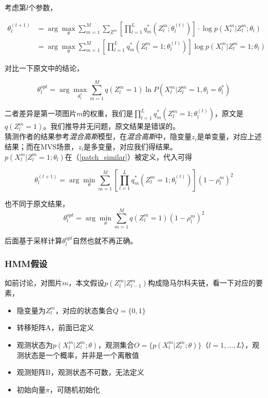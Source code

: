 		考虑第$l$个参数，

		\begin{align}
			\theta^{(t+1)}_l 
			&=\arg\max_\theta \sum_{m=1}^M \sum_{Z^m} 
			\left[ 
				\prod_{l=1}^L q^*_m(Z^m_l;\theta^{(t)}_l) \right]\cdot
				\log p(X^m_l|Z^m_l;\theta_l)
			\\
			&=\arg\max_\theta \sum_{m=1}^M 
				\left[
					\prod_{l=1}^L q^*_m(Z^m_l=1;\theta^{(t)}_l)
				\right]\log p(X^m_l|Z^m_l=1;\theta_l)\label{em_theta}
		\end{align}

		对比一下原文中的结论，

		\begin{equation}
			\theta^{opt}_l = \arg\max_{\theta^*_l}\sum_{m=1}^Mq(Z^m_l = 1)\ln P(X^m_l|Z^m_l=1,\theta_l=\theta^*_l)
		\end{equation}
		
		二者差异是第一项图片$m$的权重，我们是$\prod_{l=1}^L q^*_m(Z^m_l=1;\theta^{(t)}_l)$，原文是$q(Z^m_l = 1)$。我们推导并无问题，原文结果是错误的。\\

		猜测作者的结果参考\textit{混合高斯}模型，在\textit{混合高斯}中，隐变量$z_i$是单变量，对应上述结果；而在MVS场景，$z_i$是多变量，对应我们得结果。\\

		$p(X^m_l|Z^m_l=1;\theta_l)$在（\ref{patch_similar}）被定义，代入可得

		\begin{equation}
		\boxed{
			\theta^{(t+1)}_l = \arg\min_\theta \sum_{m=1}^M\left[
					\prod_{l=1}^L q^*_m(Z^m_l=1;\theta^{(t)}_l)
				\right]\left(1- \rho_l^m\right)^2
				}\label{correct_theta}
		\end{equation}

		也不同于原文结果，
		\begin{equation}
			\theta^{opt}_l = \arg\min_\theta \sum_{m=1}^M q(Z^m_l=1)\left(1- \rho_l^m\right)^2 \label{paper_theta}
		\end{equation}

		后面基于采样计算$\theta^{opt}_l$自然也就不再正确。

	\subsubsection*{HMM假设}

		如前讨论，对图片$m$，本文假设$p(Z^m_l|Z^m_{l-1})$构成隐马尔科夫链，看一下对应的要素，

		\begin{itemize}
			\item 隐变量为$Z^m_l$，对应的状态集合$Q=\{0,1\}$
			\item 转移矩阵A，前面已定义
			\item 观测状态为$p(X^m_l|Z^m_l;\theta)$，观测集合$O = \{p(X^m_l|Z^m_l;\theta)\}$（$l=1,\dots,L$），观测状态是一个概率，并非是一个离散值
			\item 观测矩阵B，观测状态不可数，无法定义
			\item 初始向量$\pi$，可随机初始化
		\end{itemize}

